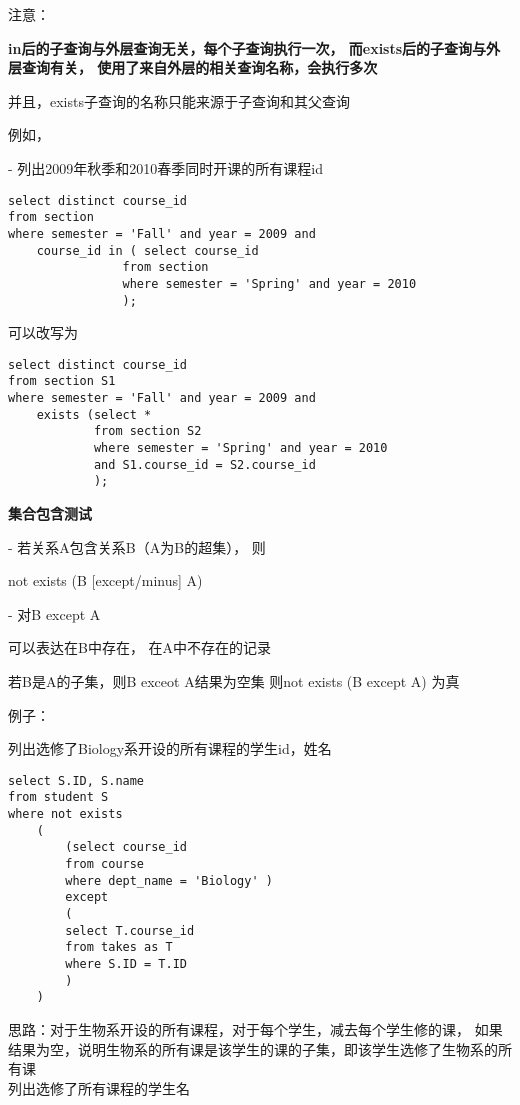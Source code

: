 \documentclass{article}        %
\begin{document}
注意：

\textbf{
in后的子查询与外层查询无关，每个子查询执行一次，
而exists后的子查询与外层查询有关，
使用了来自外层的相关查询名称，会执行多次
}

并且，exists子查询的名称只能来源于子查询和其父查询

例如，

- 列出2009年秋季和2010春季同时开课的所有课程id

\begin{verbatim}
select distinct course_id 
from section 
where semester = 'Fall' and year = 2009 and 
    course_id in ( select course_id
                from section
                where semester = 'Spring' and year = 2010
                );
\end{verbatim} 

可以改写为

\begin{verbatim}
select distinct course_id 
from section S1
where semester = 'Fall' and year = 2009 and 
    exists (select *
            from section S2
            where semester = 'Spring' and year = 2010
            and S1.course_id = S2.course_id
            );
\end{verbatim} 

\textbf{集合包含测试}

- 若关系A包含关系B（A为B的超集）， 则 

    not exists (B [except/minus] A)  

- 对B except A 

    可以表达在B中存在， 在A中不存在的记录

    若B是A的子集，则B exceot A结果为空集 则not exists (B except A) 为真

例子：

列出选修了Biology系开设的所有课程的学生id，姓名 

\begin{verbatim} 
select S.ID, S.name 
from student S  
where not exists  
    (
        (select course_id 
        from course 
        where dept_name = 'Biology' )
        except 
        (
        select T.course_id 
        from takes as T 
        where S.ID = T.ID
        )
    )
\end{verbatim} 

思路：对于生物系开设的所有课程，对于每个学生，减去每个学生修的课，
如果结果为空，说明生物系的所有课是该学生的课的子集，即该学生选修了生物系的所有课\\ 

列出选修了所有课程的学生名
\end{document}
